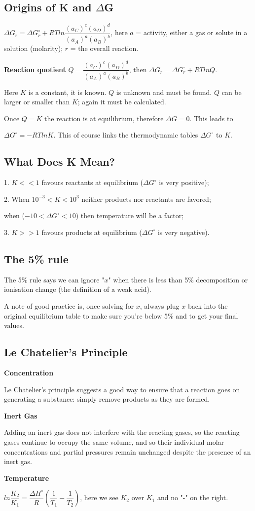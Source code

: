 \documentclass[a4paper,12pt]{article}
\begin{document}
\subsection{Origins of K and $\Delta$G}
$\Delta G_{r} = \Delta G^{\circ}_{r} + RT ln\dfrac{(a_{C})^{c}(a_{D})^{d}}{(a_{A})^{a}(a_{B})^{b}}$, here $a$ = activity, either a gas or solute in a solution (molarity); $r$ = the overall reaction.\par
\textbf{Reaction quotient} $Q =\dfrac{(a_{C})^{c}(a_{D})^{d}}{(a_{A})^{a}(a_{B})^{b}}$, then $\Delta G_{r} = \Delta G^{\circ}_{r} + RT lnQ$.\par
 Here $K$ is a constant, it is known. $Q$ is unknown and must be found. $Q$ can be larger or smaller than $K$; again it must be calculated.\par
Once $Q = K$ the reaction is at equilibrium, therefore $\Delta G=0$. This leads to\par
$\Delta G^{\circ}=-RTlnK$. This of course links the thermodynamic tables $\Delta G^{\circ}$ to $K$.\par
\subsection{What Does K Mean?}
1. $K << 1$ favours reactants at equilibrium ($\Delta G^{\circ}$ is very positive);\par
2. When $10^{-3} < K < 10^{3}$ neither products nor reactants are favored;\par when ($-10<\Delta G^{\circ}<10$) then temperature will be a factor;\par
3. $K >> 1$ favours products at equilibrium ($\Delta G^{\circ}$ is very negative).
\subsection{The 5\% rule}
The 5\% rule says we can ignore "$x$" when there is less than 5\% decomposition or ionisation change (the definition of a weak acid).\par
A note of good practice is, once solving for $x$, always plug $x$ back into the original equilibrium table to make sure you’re below 5\% and to get your final values.
\subsection{Le Chatelier's Principle}
\textbf{Concentration}\par
Le Chatelier's principle suggests a good way to ensure that a reaction goes on generating a substance: simply remove products as they are formed.\par
\textbf{Inert Gas}\par
Adding an inert gas does not interfere with the reacting gases, so the reacting gases continue to occupy the same volume, and so their individual molar concentrations and partial pressures remain unchanged despite the presence of an inert gas.\par
\textbf{Temperature}\par
$ln\dfrac{K_{2}}{K_{1}}=\dfrac{\Delta H^{\circ}}{R}(\dfrac{1}{T_{1}}-\dfrac{1}{T_{2}})$, here we see $K_{2}$ over $K_{1}$ and no "-" on the right.
\end{document}
